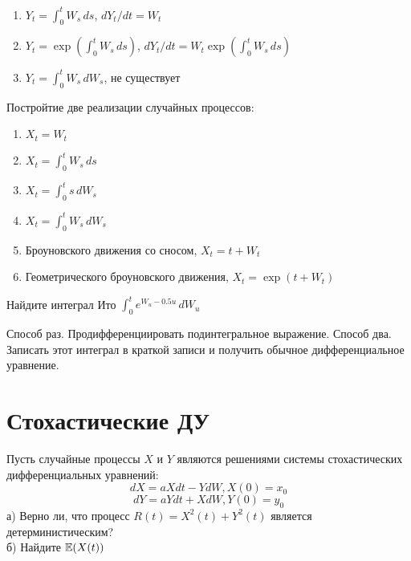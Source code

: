\begin{solution}
\begin{enumerate}
\item $Y_t=\int_0^t W_s \, ds$, $dY_t/dt=W_t$
\item $Y_t=\exp (\int_0^t W_s \, ds)$, $dY_t/dt=W_t\exp (\int_0^t W_s \, ds)$
\item $Y_t=\int_0^t W_s \, dW_s$, не существует
\end{enumerate}
\end{solution}

\begin{problem}
Постройтие две реализации случайных процессов:
\begin{enumerate}
\item $X_t=W_t$
\item $X_t=\int_0^t W_s \, ds$
\item $X_t=\int_0^t s \, dW_s$
\item $X_t=\int_0^t W_s \, dW_s$
\item Броуновского движения со сносом, $X_t=t+W_t$
\item Геометрического броуновского движения, $X_t=\exp(t+W_t)$
\end{enumerate}
\end{problem}

\begin{solution}
\end{solution}

\begin{problem}
Найдите интеграл Ито $\int_0^t e^{W_u - 0.5 u} \, dW_u$
\end{problem}

\begin{solution}
Способ раз. Продифференциировать подинтегральное выражение. Способ два. Записать этот интеграл в краткой записи и получить обычное дифференциальное уравнение. 
\end{solution}

\section{Стохастические ДУ} 

\begin{problem}
Пусть случайные процессы $X$ и $Y$ являются решениями системы стохастических дифференциальных уравнений: 
$$dX=aXdt-YdW, X(0)=x_{0}$$
$$dY=aYdt+XdW, Y(0)=y_{0}$$
а) Верно ли, что процесс $R(t)=X^{2}(t)+Y^{2}(t)$ является детерминистическим? \\
б) Найдите $\mathbb{E}(X(t))$ \\

\end{problem} 
\begin{solution} 

\end{solution}

